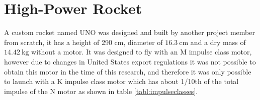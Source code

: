 \documentclass[draft]{report}
\begin{document}






\section{High-Power Rocket}

A custom rocket named UNO was designed and built by another project member from scratch, it has a height of 290 cm, diameter of $\SI{16.3}{\centi\metre}$ and a dry mass of $\SI{14.42}{\kilo\gram}$ without a motor. It was designed to fly with an M impulse class motor, however due to changes in United States export regulations it was not possible to obtain this motor in the time of this research, and therefore it was only possible to launch with a K impulse class motor which has about 1/10th of the total impulse of the N motor as shown in table \ref{tabl:impulseclasses}.
\end{document}

